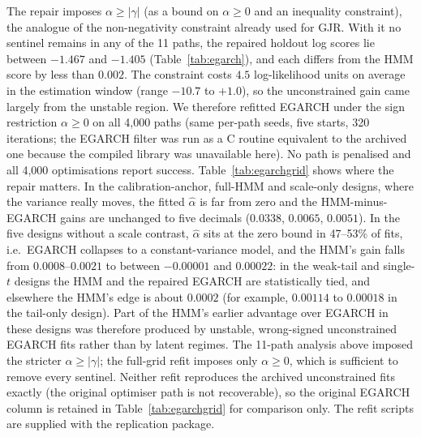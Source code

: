 \documentclass[11pt,a4paper]{article}
\theoremstyle{plain}
\theoremstyle{remark}
\begin{document}
The repair imposes $\alpha\ge|\gamma|$ (as a bound on $\alpha\ge0$ and an inequality constraint), the analogue of the non-negativity constraint already used for GJR. With it no sentinel remains in any of the 11 paths, the repaired holdout log scores lie between $-1.467$ and $-1.405$ (Table~\ref{tab:egarch}), and each differs from the HMM score by less than $0.002$. The constraint costs $4.5$ log-likelihood units on average in the estimation window (range $-10.7$ to $+1.0$), so the unconstrained gain came largely from the unstable region. We therefore refitted EGARCH under the sign restriction $\alpha\ge0$ on all 4{,}000 paths (same per-path seeds, five starts, 320 iterations; the EGARCH filter was run as a C routine equivalent to the archived one because the compiled library was unavailable here). No path is penalised and all 4{,}000 optimisations report success. Table~\ref{tab:egarchgrid} shows where the repair matters. In the calibration-anchor, full-HMM and scale-only designs, where the variance really moves, the fitted $\hat\alpha$ is far from zero and the HMM-minus-EGARCH gains are unchanged to five decimals ($0.0338$, $0.0065$, $0.0051$). In the five designs without a scale contrast, $\hat\alpha$ sits at the zero bound in 47--53\% of fits, i.e.\ EGARCH collapses to a constant-variance model, and the HMM's gain falls from $0.0008$--$0.0021$ to between $-0.00001$ and $0.00022$: in the weak-tail and single-$t$ designs the HMM and the repaired EGARCH are statistically tied, and elsewhere the HMM's edge is about $0.0002$ (for example, $0.00114$ to $0.00018$ in the tail-only design). Part of the HMM's earlier advantage over EGARCH in these designs was therefore produced by unstable, wrong-signed unconstrained EGARCH fits rather than by latent regimes. The 11-path analysis above imposed the stricter $\alpha\ge|\gamma|$; the full-grid refit imposes only $\alpha\ge0$, which is sufficient to remove every sentinel. Neither refit reproduces the archived unconstrained fits exactly (the original optimiser path is not recoverable), so the original EGARCH column is retained in Table~\ref{tab:egarchgrid} for comparison only. The refit scripts are supplied with the replication package.
\end{document}
